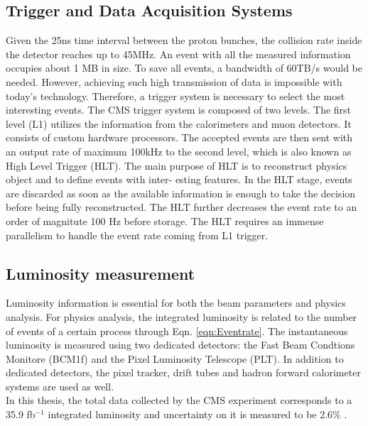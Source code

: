 \subsection{Trigger and Data Acquisition Systems }
Given the 25ns time interval between the proton bunches, the collision rate inside the detector reaches up to 45MHz.  An event with all the measured information occupies about 1 MB in size. To save all events, a bandwidth of 60TB/s would be needed. However, achieving such high transmission of data is impossible with today’s technology. Therefore, a trigger system is necessary to select the most interesting events. The CMS trigger system is composed of two levels. The first level (L1) utilizes the information from the calorimeters and muon detectors. It consists of custom hardware processors. The accepted events are then sent with an output rate of maximum 100kHz to the second level, which is also known as High Level Trigger (HLT). The main purpose of HLT is to reconstruct physics object and to define events with inter- esting features. In the HLT stage, events are discarded as soon as the available information is enough to take the decision before being fully reconstructed. The HLT further decreases the event rate to an order of magnitute 100 Hz before storage. The HLT requires an immense parallelism to handle the event rate coming from L1 trigger.
\subsection{Luminosity measurement}
\label{sec:luminosity}
Luminosity information is essential for both the beam parameters and physics analysis. For physics analysis, the integrated luminosity is related to the number of events of a certain process through Eqn. \ref{eqn:Eventrate}. The instantaneous luminosity is measured using two dedicated detectors: the Fast Beam Condtions Monitore (BCM1f) \cite{LUMTECH} and the Pixel Luminosity Telescope (PLT).  In addition to dedicated detectors, the pixel tracker, drift tubes and hadron forward calorimeter systems are used as well. \\
In this thesis, the total data collected by the CMS experiment corresponds to a 35.9 fb$^{-1}$ integrated luminosity and uncertainty on it is measured to be 2.6\% \cite{lumi1}.
